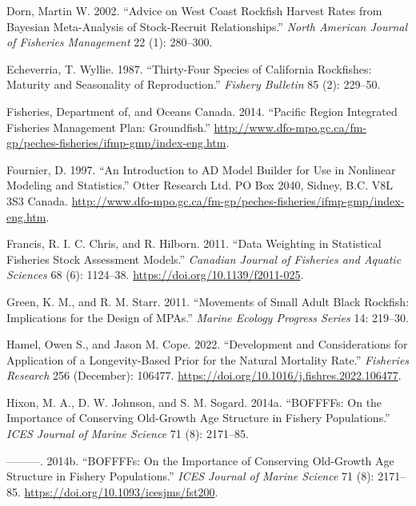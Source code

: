 \documentclass[11pt,
  english,
  letterpaper,
]{article}
\newlength{\cslhangindent}
\newenvironment{CSLReferences}[2] %
 {%
  \setlength{\parindent}{0pt}
  \ifodd #1 \everypar{\setlength{\hangindent}{\cslhangindent}}\ignorespaces\fi
  \ifnum #2 > 0
  \setlength{\parskip}{#2\baselineskip}
  \fi
 }%
 {}
\begin{document}
\begin{CSLReferences}{1}{0}
\leavevmode{}%
Dorn, Martin W. 2002. {``Advice on {West} {Coast} Rockfish Harvest Rates from {B}ayesian Meta-Analysis of Stock-Recruit Relationships.''} \emph{North American Journal of Fisheries Management} 22 (1): 280--300.

\leavevmode{}%
Echeverria, T. Wyllie. 1987. {``Thirty-Four Species of California Rockfishes: Maturity and Seasonality of Reproduction.''} \emph{Fishery Bulletin} 85 (2): 229--50.

\leavevmode{}%
Fisheries, Department of, and Oceans Canada. 2014. {``Pacific Region Integrated Fisheries Management Plan: Groundfish.''} \url{http://www.dfo-mpo.gc.ca/fm-gp/peches-fisheries/ifmp-gmp/index-eng.htm}.

\leavevmode{}%
Fournier, D. 1997. {``An Introduction to AD Model Builder for Use in Nonlinear Modeling and Statistics.''} Otter Research Ltd. PO Box 2040, Sidney, B.C. V8L 3S3 Canada. \url{http://www.dfo-mpo.gc.ca/fm-gp/peches-fisheries/ifmp-gmp/index-eng.htm}.

\leavevmode{}%
Francis, R. I. C. Chris, and R. Hilborn. 2011. {``Data Weighting in Statistical Fisheries Stock Assessment Models.''} \emph{Canadian Journal of Fisheries and Aquatic Sciences} 68 (6): 1124--38. \url{https://doi.org/10.1139/f2011-025}.

\leavevmode{}%
Green, K. M., and R. M. Starr. 2011. {``Movements of Small Adult Black Rockfish: Implications for the Design of MPAs.''} \emph{Marine Ecology Progress Series} 14: 219--30.

\leavevmode{}%
Hamel, Owen S., and Jason M. Cope. 2022. {``Development and Considerations for Application of a Longevity-Based Prior for the Natural Mortality Rate.''} \emph{Fisheries Research} 256 (December): 106477. \url{https://doi.org/10.1016/j.fishres.2022.106477}.

\leavevmode{}%
Hixon, M. A., D. W. Johnson, and S. M. Sogard. 2014a. {``BOFFFFs: On the Importance of Conserving Old-Growth Age Structure in Fishery Populations.''} \emph{ICES Journal of Marine Science} 71 (8): 2171--85.

\leavevmode{}%
---------. 2014b. {``{BOFFFFs}: On the Importance of Conserving Old-Growth Age Structure in Fishery Populations.''} \emph{{ICES} Journal of Marine Science} 71 (8): 2171--85. \url{https://doi.org/10.1093/icesjms/fst200}.


\end{CSLReferences}
\end{document}
